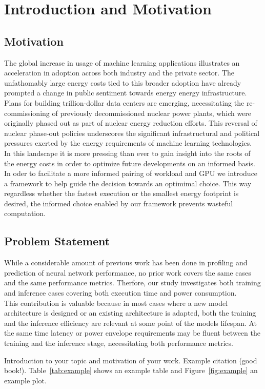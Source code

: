 \chapter{Introduction and Motivation}\label{chap:introduction}

\section{Motivation}

The global increase in usage of machine learning applications
 illustrates an acceleration in adoption across
both industry and the private sector. The unfathomably
large energy costs tied to this broader adoption have
already prompted a change in public sentiment towards
 energy energy infrastructure. Plans for building
trillion-dollar data centers are emerging, necessitating
the re-commissioning of previously decommissioned
nuclear power plants, which were originally phased
out as part of nuclear energy reduction efforts. This
reversal of nuclear phase-out policies underscores the
significant infrastructural and political pressures
exerted by the energy requirements of machine learning
technologies. \\
In this landscape it is more pressing than ever to gain
insight into the roots of the energy costs in order to
optimize future developments on an informed basis. \\
In oder to facilitate a more informed pairing of workload 
and GPU we introduce a framework to help guide the decision 
towards an optimimal choice. This way regardless whether 
the fastest execution or the smallest energy footprint is 
desired, the informed choice enabled by our framework
prevents wasteful computation.

\section{Problem Statement}
While a considerable amount of previous work has been done in
profiling and prediction of neural network performance, no prior
work covers the same cases and the same performance metrics.
Therfore, our study investigates both training and inference cases 
covering both execution time and power consumption. \\
This contribution is valuable because in most cases where a new model
architecture is designed or an existing architecture is adapted, 
both the training and the inference efficiency are relevant at some
point of the models lifespan. At the same time latency or power 
envelope requirements may be fluent between the training and the
inference stage, necessitating both performance metrics.

Introduction to your topic and motivation of your work.
Example citation \cite{bishopPatternRecognitionMachine2006} (good book!).
Table~\ref{tab:example} shows an example table and Figure~\ref{fig:example} an
example plot.





